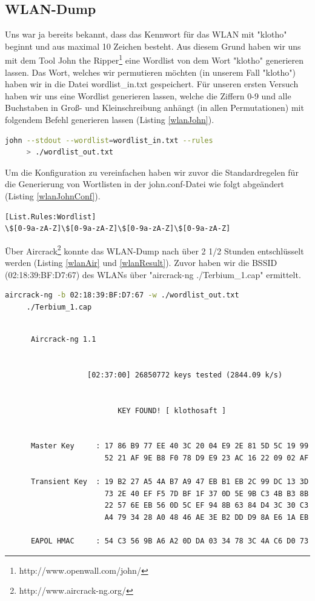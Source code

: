\documentclass[12pt]{article}
\begin{document}
\subsection{WLAN-Dump}
Uns war ja bereits bekannt, dass das Kennwort für das WLAN mit "klotho" beginnt und aus maximal 10 Zeichen besteht. Aus diesem Grund haben wir uns mit dem Tool John the Ripper\footnote{http://www.openwall.com/john/} eine Wordlist von dem Wort "klotho" generieren lassen. Das Wort, welches wir permutieren möchten (in unserem Fall "klotho") haben wir in die Datei wordlist\_in.txt gespeichert. Für unseren ersten Versuch haben wir uns eine Wordlist generieren lassen, welche die Ziffern 0-9 und alle Buchstaben in Groß- und Kleinschreibung anhängt (in allen Permutationen) mit folgendem Befehl generieren lassen (Listing \ref{wlanJohn}). 
\begin{lstlisting}[language=sh, caption={Befehl zur Gerneriung der Wordlist},label=wlanJohn,basicstyle=\footnotesize]
john --stdout --wordlist=wordlist_in.txt --rules 
     > ./wordlist_out.txt
\end{lstlisting}
Um die Konfiguration zu vereinfachen haben wir zuvor die Standardregelen für die Generierung von Wortlisten in der john.conf-Datei wie folgt abgeändert (Listing \ref{wlanJohnConf}).
\begin{lstlisting}[caption={Regelsatz zur Generierung einer Wortliste mit genau 10 Zeichen},label=wlanJohnConf,basicstyle=\footnotesize]
[List.Rules:Wordlist]
\$[0-9a-zA-Z]\$[0-9a-zA-Z]\$[0-9a-zA-Z]\$[0-9a-zA-Z]
\end{lstlisting}
Über Aircrack\footnote{http://www.aircrack-ng.org/} konnte das WLAN-Dump nach über 2 1/2 Stunden entschlüsselt werden (Listing \ref{wlanAir} und \ref{wlanResult}). Zuvor haben wir die BSSID (02:18:39:BF:D7:67) des WLANs über "aircrack-ng ./Terbium\_1.cap" ermittelt.
\begin{lstlisting}[language=sh, caption={Befehl zum BruteForce Angriff mit Hilfe der generierten WordList},label=wlanAir,basicstyle=\footnotesize]
aircrack-ng -b 02:18:39:BF:D7:67 -w ./wordlist_out.txt 
     ./Terbium_1.cap
\end{lstlisting}
\begin{lstlisting}[caption={AirCrack Resultat},label=wlanResult,basicstyle=\tiny]

      Aircrack-ng 1.1


                   [02:37:00] 26850772 keys tested (2844.09 k/s)


                          KEY FOUND! [ klothosaft ]


      Master Key     : 17 86 B9 77 EE 40 3C 20 04 E9 2E 81 5D 5C 19 99 
                       52 21 AF 9E B8 F0 78 D9 E9 23 AC 16 22 09 02 AF 

      Transient Key  : 19 B2 27 A5 4A B7 A9 47 EB B1 EB 2C 99 DC 13 3D 
                       73 2E 40 EF F5 7D BF 1F 37 0D 5E 9B C3 4B B3 8B 
                       22 57 6E EB 56 0D 5C EF 94 8B 63 84 D4 3C 30 C3 
                       A4 79 34 28 A0 48 46 AE 3E B2 DD D9 8A E6 1A EB 

      EAPOL HMAC     : 54 C3 56 9B A6 A2 0D DA 03 34 78 3C 4A C6 D0 73 
\end{lstlisting}
\end{document}
